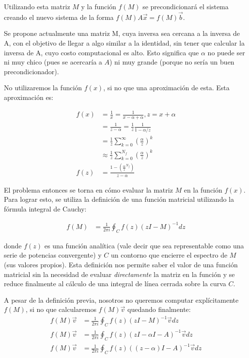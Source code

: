 \documentclass[fleqn]{article}
\begin{document}
Utilizando esta matriz $M$ y la función $f(M)$ se precondicionará el sistema creando el nuevo sistema de la forma $f(M)A\vec{x} = f(M)\vec{b}$. 

Se propone actualmente una matriz M, cuya inversa sea cercana a la inversa de A, con el objetivo de llegar a algo similar a la identidad, sin tener que calcular la inversa de A, cuyo costo computacional es alto. Esto significa que $\alpha$ no puede ser ni muy chico (pues se acercaría a $A$) ni muy grande (porque no sería un buen precondicionador).

No utilizaremos la función $f(x)$, si no que una aproximación de esta. Esta aproximación es:

\begin{align*}
    f(x) &= \frac{1}{x} = \frac{1}{x - \alpha + \alpha}, z = x + \alpha \\
         &= \frac{1}{z - \alpha} = \frac{1}{z}\frac{1}{1 - \alpha/z} \\
         &= \frac{1}{z}\sum_{k = 0}^{\infty}(\frac{\alpha}{z})^k \\
         &\approx \frac{1}{z}\sum_{k = 0}^{N_f}(\frac{\alpha}{z})^k \\
    f(z) &= \frac{1 - (\frac{\alpha}{z}^{N_f})}{z - \alpha}
\end{align*}

El problema entonces se torna en cómo evaluar la matriz $M$ en la función $f(x)$. Para lograr esto, se utiliza la definición de una función matricial utilizando la fórmula integral de Cauchy:

\begin{align}
f(M) &= \frac{1}{2\pi i} \oint_C f(z)(zI - M)^{-1}dz
\end{align}

donde $f(z)$ es una función analítica (vale decir que sea representable como una serie de potencias convergente) y $C$ un contorno que encierre el espectro de $M$ (sus valores propios). Esta definición nos permite saber el valor de una función matricial sin la necesidad de evaluar \textit{directamente} la matriz en la función y se reduce finalmente al cálculo de una integral de línea cerrada sobre la curva $C$.

A pesar de la definición previa, nosotros no queremos computar explícitamente $f(M)$, si no que calcularemos $f(M)\vec{v}$ quedando finalmente:
\begin{align*}
f(M)\vec{v} &= \frac{1}{2\pi i} \oint_C f(z)(zI - M)^{-1}\vec{v}dz\\
f(M)\vec{v} &= \frac{1}{2\pi i} \oint_C f(z)(zI - \alpha I -A)^{-1}\vec{v}dz \\
f(M)\vec{v} &= \frac{1}{2\pi i} \oint_C f(z)((z - \alpha)I -A)^{-1}\vec{v}dz
\end{align*}
\end{document}
